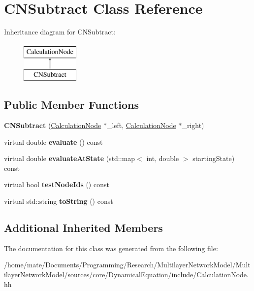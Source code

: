 \hypertarget{classCNSubtract}{}\section{C\+N\+Subtract Class Reference}
\label{classCNSubtract}
Inheritance diagram for C\+N\+Subtract\+:\begin{figure}[H]
\begin{center}
\leavevmode
\includegraphics[height=2.000000cm]{classCNSubtract}
\end{center}
\end{figure}
\subsection*{Public Member Functions}
\begin{DoxyCompactItemize}
\item 
{\bfseries C\+N\+Subtract} (\hyperlink{classCalculationNode}{Calculation\+Node} $\ast$\+\_\+left, \hyperlink{classCalculationNode}{Calculation\+Node} $\ast$\+\_\+right)\hypertarget{classCNSubtract_ab72c2b6679137655582d2001ac420dbf}{}\label{classCNSubtract_ab72c2b6679137655582d2001ac420dbf}

\item 
virtual double {\bfseries evaluate} () const \hypertarget{classCNSubtract_ae57879411a77bf2a5b16f28aa488a3d6}{}\label{classCNSubtract_ae57879411a77bf2a5b16f28aa488a3d6}

\item 
virtual double {\bfseries evaluate\+At\+State} (std\+::map$<$ int, double $>$ starting\+State) const \hypertarget{classCNSubtract_aa1d22fea2c4d0cdd26e64725d2be5205}{}\label{classCNSubtract_aa1d22fea2c4d0cdd26e64725d2be5205}

\item 
virtual bool {\bfseries test\+Node\+Ids} () const \hypertarget{classCNSubtract_a83d03d12f8b0b209c78dda0d783453e1}{}\label{classCNSubtract_a83d03d12f8b0b209c78dda0d783453e1}

\item 
virtual std\+::string {\bfseries to\+String} () const \hypertarget{classCNSubtract_a19ed00fcb52d52d40d97ed79a62e6dcd}{}\label{classCNSubtract_a19ed00fcb52d52d40d97ed79a62e6dcd}

\end{DoxyCompactItemize}
\subsection*{Additional Inherited Members}


The documentation for this class was generated from the following file\+:\begin{DoxyCompactItemize}
\item 
/home/mate/\+Documents/\+Programming/\+Research/\+Multilayer\+Network\+Model/\+Multilayer\+Network\+Model/sources/core/\+Dynamical\+Equation/include/Calculation\+Node.\+hh\end{DoxyCompactItemize}
